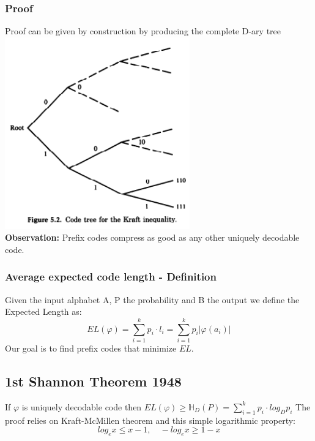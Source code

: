    \subsubsection{Proof}
    Proof can be given by construction by producing the complete D-ary tree \\
    \includegraphics[width=8cm]{Information Theory/Data Compression/Kraft-McMillen-Inequality-Proof-Diagram.png}\\
    \textbf{Observation:} Prefix codes compress as good as any other uniquely decodable code.
    \subsubsection{Average expected code length - Definition}
    Given the input alphabet A, P the probability and B the output we define the Expected Length as:
    \begin{equation}
        EL(\varphi)=\sum_{i=1}^{k}{p_i\cdot l_i}=\sum_{i=1}^{k}{p_i|\varphi(a_i)|}
    \end{equation}
    Our goal is to find prefix codes that minimize $EL$.
    
    \subsection{1st Shannon Theorem 1948}
    If $\varphi$ is uniquely decodable code then $EL(\varphi)\geq \mathbb{H}_D(P)=\sum_{i=1}^{k}{p_i\cdot log_D{p_i}}$
    The proof relies on Kraft-McMillen theorem and this simple logarithmic property:
    $$log_e{x}\leq x-1, \quad -log_e{x}\geq 1-x$$
